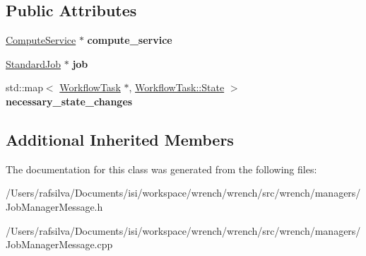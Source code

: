 \subsection*{Public Attributes}
\begin{DoxyCompactItemize}
\item 
\mbox{\label{classwrench_1_1_job_manager_standard_job_done_message_a986e1cfdf55ceaaf272a8e9f7b237e0c}} 
\hyperlink{classwrench_1_1_compute_service}{Compute\+Service} $\ast$ {\bfseries compute\+\_\+service}
\item 
\mbox{\label{classwrench_1_1_job_manager_standard_job_done_message_ad761ff38c8cd75e8397f465d62cfb01b}} 
\hyperlink{classwrench_1_1_standard_job}{Standard\+Job} $\ast$ {\bfseries job}
\item 
\mbox{\label{classwrench_1_1_job_manager_standard_job_done_message_a24cb65e78ab79663734a76ff3c24e995}} 
std\+::map$<$ \hyperlink{classwrench_1_1_workflow_task}{Workflow\+Task} $\ast$, \hyperlink{classwrench_1_1_workflow_task_a1184f3d7aea21e1c87a9b17e84f1f92a}{Workflow\+Task\+::\+State} $>$ {\bfseries necessary\+\_\+state\+\_\+changes}
\end{DoxyCompactItemize}
\subsection*{Additional Inherited Members}


The documentation for this class was generated from the following files\+:\begin{DoxyCompactItemize}
\item 
/\+Users/rafsilva/\+Documents/isi/workspace/wrench/wrench/src/wrench/managers/Job\+Manager\+Message.\+h\item 
/\+Users/rafsilva/\+Documents/isi/workspace/wrench/wrench/src/wrench/managers/Job\+Manager\+Message.\+cpp\end{DoxyCompactItemize}
